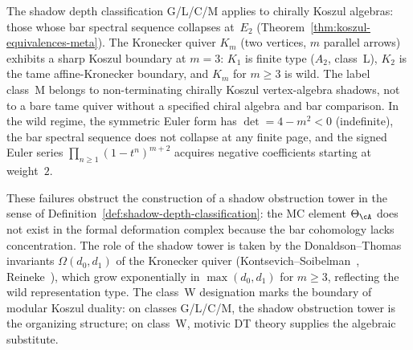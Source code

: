 \begin{remark}
\label{rem:wild-quiver-class}
%
%
%
The shadow depth classification G/L/C/M applies to chirally Koszul
algebras: those whose bar spectral sequence collapses at~$E_2$
(Theorem~\ref{thm:koszul-equivalences-meta}). The Kronecker quiver
$K_m$ (two vertices, $m$ parallel arrows) exhibits a sharp Koszul
boundary at $m = 3$: $K_1$ is finite type ($A_2$, class~L),
$K_2$ is the tame affine-Kronecker boundary, and $K_m$ for
$m \geq 3$ is wild. The label class~M belongs to non-terminating
chirally Koszul vertex-algebra shadows, not to a bare tame quiver
without a specified chiral algebra and bar comparison. In the wild regime, the symmetric Euler form
has $\det = 4 - m^2 < 0$ (indefinite), the bar spectral sequence
does not collapse at any finite page, and the signed Euler series
$\prod_{n \geq 1}(1 - t^n)^{m+2}$ acquires negative coefficients
starting at weight~$2$.

These failures obstruct the construction of a shadow obstruction
tower in the sense of Definition~\ref{def:shadow-depth-classification}:
the MC element $\Theta_\cA$ does not exist in the formal deformation
complex because the bar cohomology lacks concentration. The role of
the shadow tower is taken by the Donaldson--Thomas invariants
$\Omega(d_0, d_1)$ of the Kronecker quiver
(Kontsevich--Soibelman~\cite{KS10}, Reineke~\cite{Re03}),
which grow exponentially in $\max(d_0, d_1)$ for $m \geq 3$,
reflecting the wild representation type. The class~W designation
marks the boundary of modular Koszul duality: on classes G/L/C/M,
the shadow obstruction tower is the organizing structure; on
class~W, motivic DT theory supplies the algebraic substitute.
\end{remark}


